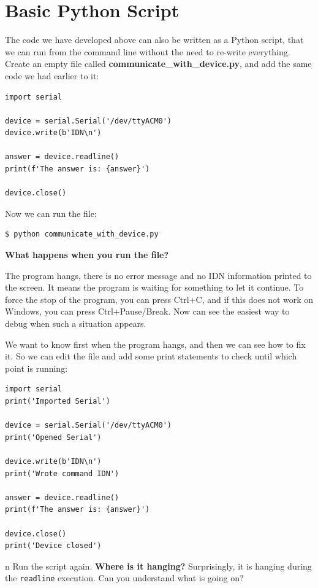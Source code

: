 \section{Basic Python Script}
The code we have developed above can also be written as a Python script, that we can run from the command line without the need to re-write everything. Create an empty file called \textbf{communicate\_with\_device.py}, and add the same code we had earlier to it:

\begin{verbatim}
import serial

device = serial.Serial('/dev/ttyACM0')
device.write(b'IDN\n')

answer = device.readline()
print(f'The answer is: {answer}')

device.close()
\end{verbatim}

Now we can run the file:

\begin{verbatim}
$ python communicate_with_device.py
\end{verbatim}


\textbf{What happens when you run the file?}

The program hangs, there is no error message and no IDN information printed to the screen. It means the program is waiting for something to let it continue. To force the stop of the program, you can press Ctrl+C, and if this does not work on Windows, you can press Ctrl+Pause/Break. Now can see the easiest way to debug when such a situation appears.

We want to know first when the program hangs, and then we can see how to fix it. So we can edit the file and add some print statements to check until which point is running:

\begin{verbatim}
import serial
print('Imported Serial')

device = serial.Serial('/dev/ttyACM0')
print('Opened Serial')

device.write(b'IDN\n')
print('Wrote command IDN')

answer = device.readline()
print(f'The answer is: {answer}')

device.close()
print('Device closed')
\end{verbatim}n
Run the script again. \textbf{Where is it hanging?} Surprisingly, it is hanging during the \texttt{readline} execution. Can you understand what is going on?

